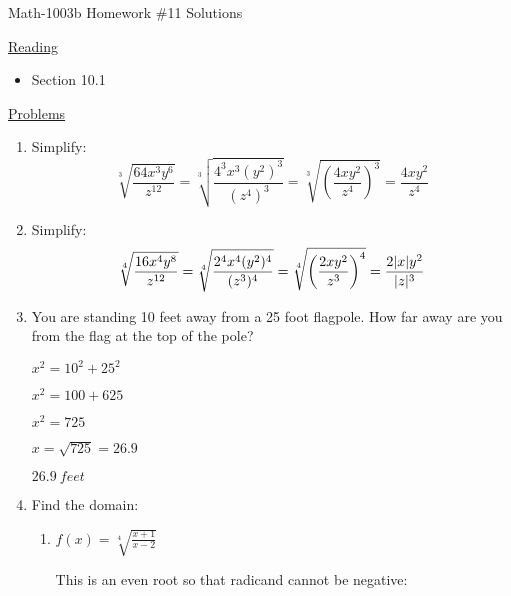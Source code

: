 \documentclass[letterpaper,12pt,fleqn]{article}
\begin{document}
\begin{center}
\Large Math-1003b Homework \#11 Solutions
\end{center}

\vspace{0.5in}

\underline{Reading}

\bigskip

\begin{itemize}
\item Section 10.1
\end{itemize}

\bigskip

\underline{Problems}

\bigskip

\begin{enumerate}
\item Simplify:
  \[\sqrt[3]{\frac{64x^3y^6}{z^{12}}}=\sqrt[3]{\frac{4^3x^3(y^2)^3}{(z^4)^3}}
  =\sqrt[3]{\left(\frac{4xy^2}{z^4}\right)^3}=\frac{4xy^2}{z^4}\]

\item Simplify:
  \[\sqrt[4]{\frac{16x^4y^8}{z^{12}}}=\sqrt[4]{\frac{2^4x^4(y^2)^4}{(z^3)^4}}=
  \sqrt[4]{\left(\frac{2xy^2}{z^3}\right)^4}=\frac{2\lvert x\rvert y^2}{\lvert z\rvert^3}\]

\item You are standing 10 feet away from a 25 foot flagpole. How far away are you from
  the flag at the top of the pole?

  \begin{minipage}{2in}
  \end{minipage}
  \begin{minipage}{3in}
    $x^2=10^2+25^2$

    $x^2=100+625$

    $x^2=725$

    $x=\sqrt{725}=26.9$

    $\SI{26.9}{feet}$
  \end{minipage}

\item Find the domain:
  \begin{enumerate}
  \item $f(x)=\sqrt[4]{\frac{x+1}{x-2}}$

    This is an even root so that radicand cannot be negative:


\end{enumerate}
\end{enumerate}
\end{document}
